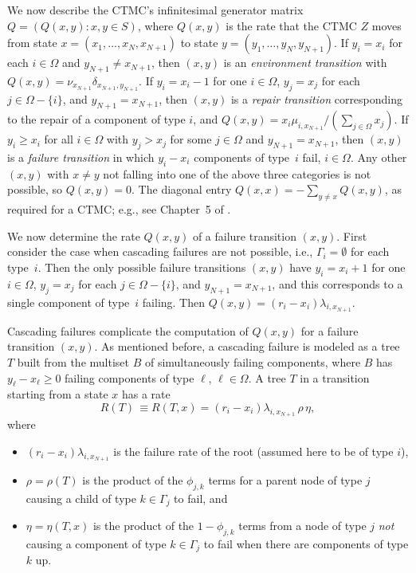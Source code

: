 \documentclass[12pt]{article}
\newcommand{\changed}[1]{#1}
\newcommand{\changedii}[1]{#1}
\newcommand{\changed}[1]{\textcolor{red}{#1}}
\newcommand{\changedii}[1]{\textcolor{blue}{#1}}
\begin{document}
We now describe the CTMC's infinitesimal generator matrix $Q = (Q(x, y) : x, y
\in S)$, where $Q(x, y)$ is the rate that the CTMC $Z$ moves from state $x =
(x_1, \ldots, x_N, x_{N + 1})$ to state $y = (y_1, \ldots, y_N, y_{N + 1})$. If
$y_i = x_i$ for each $i \in \Omega$ and $y_{N + 1} \neq x_{N + 1}$, then $(x,
y)$ is an \textit{environment transition} with $Q(x, y) = \nu_{x_{N + 1}}
\delta_{x_{N + 1},y_{N + 1}}$. If $y_i = x_i - 1$ for one $i \in \Omega$, $y_j =
x_j$ for each $j \in \Omega - \{ i \}$, and $y_{N + 1} = x_{N + 1}$, then $(x,
y)$ is a \textit{repair transition} corresponding to the repair of a component
of type $i$, and $Q(x, y) = x_i \mu_{i,x_{N + 1}}/(\sum_{j \in \Omega} x_j)$. If
$y_i \geq x_i$ for all $i \in \Omega$ with $y_j > x_j$ for some $j \in \Omega$
and $y_{N + 1} = x_{N + 1}$, then $(x, y)$ is a \textit{failure transition} in
which $y_i - x_i$ components of type~$i$ fail, $i \in \Omega$. Any other $(x,
y)$ with $x \neq y$ not falling into one of the above three categories is not
possible, so $Q(x, y) = 0$. The diagonal entry $Q(x, x) = -\sum_{y \neq x} Q(x,
y)$, as required for a CTMC; e.g., see Chapter~5 of
\cite{Ross:1995}.

We now determine the rate $Q(x, y)$ of 
a failure transition $(x, y)$. First
consider the case when cascading failures 
are not possible, i.e., 
$\Gamma_i = \emptyset$ for each type~$i$. 
Then the only possible failure transitions 
$(x,y)$ have $y_i = x_i + 1$ 
for one $i \in \Omega$, $y_j = x_j$ for each 
$j \in \Omega - \{ i \}$, 
and $y_{N + 1} = x_{N + 1}$, and this 
corresponds to a single
component of type~$i$ failing. 
Then $Q(x, y) = (r_i - x_i) \lambda_{i, x_{N + 1}}$.

Cascading failures complicate the computation of 
$Q(x, y)$ for a failure
transition $(x, y)$. As mentioned before, 
a cascading failure is modeled as a
tree $T$ built from the multiset $B$ of 
simultaneously failing components, where
$B$ has $y_\ell - x_\ell \changedii{\geq 0}$ 
failing components of type $\ell$, $\ell \in \Omega$.
A tree $T$
\changed{in a transition starting
from a state $x$}
has a rate
\begin{equation}
\label{eq:rate}
R(T)
\changed{ \, \equiv
R(T,x)}
= (r_i - x_i) \lambda_{i,x_{N + 1}} \, \rho \, \eta,
\end{equation}
where
\begin{itemize}
\item $(r_i - x_i) \lambda_{i,x_{N + 1}}$ is the failure rate of the root
(assumed here to be of type $i$),
\item $\rho = \rho(T)$ is the product of the
$\phi_{j, k}$ terms for a parent node of type $j$ causing a child of type $k \in
\Gamma_j$ to fail, and
\item $\eta = \eta(T,x)$ is the product of the $1 - \phi_{j, k}$ terms from a
node of type $j$ \textit{not} causing a component of type $k \in \Gamma_j$ to
fail when there are components of type $k$ up.
\end{itemize}
\end{document}
